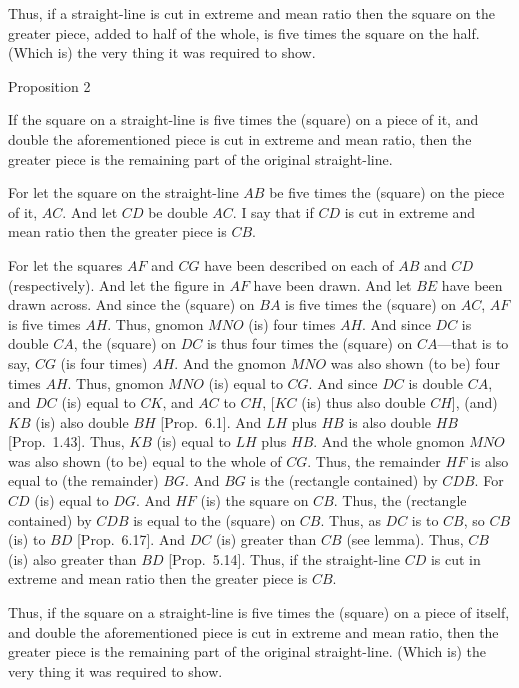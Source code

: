 Thus, if a straight-line is cut in extreme and mean ratio then the square on the
greater piece, added to half of the whole, is five times the square
on the half. (Which is) the very thing it was required to show.


\begin{center}
{\large Proposition 2}
\end{center}

If the square on a straight-line is five times the (square) on a piece of
it, and  double the aforementioned piece is cut in extreme and
mean ratio, then the greater piece  is  the remaining part of the
original straight-line. 

\epsfysize=2.5in
\centerline{}

For let the square on the straight-line $AB$ be five times the (square)
on the piece of it, $AC$. And let $CD$ be double $AC$. I say that
if $CD$ is cut in extreme and mean ratio then the greater piece
is $CB$. 

For let the squares $AF$ and $CG$ have been described on each of
$AB$ and $CD$ (respectively). And let the figure  in $AF$ have been drawn.
And let $BE$ have been drawn across. And since the (square) on $BA$
is five times the (square) on $AC$, $AF$ is five times $AH$. 
Thus, gnomon $MNO$ (is) four times $AH$. 
And since
$DC$ is double $CA$, the (square) on $DC$ is thus four times the (square)
on $CA$---that is to say, $CG$ (is four times) $AH$. And the gnomon
$MNO$ was also shown (to be) four times $AH$. Thus, gnomon $MNO$
(is) equal to $CG$. And since $DC$ is double $CA$, and $DC$
(is) equal to $CK$, and $AC$ to $CH$, [$KC$ (is) thus also double $CH$], (and) $KB$ (is) also double $BH$
[Prop.~6.1]. And $LH$ plus $HB$ is also double $HB$ [Prop.~1.43].
Thus, $KB$ (is) equal to $LH$ plus $HB$. And the whole gnomon
$MNO$ was also shown (to be) equal to the whole of $CG$. Thus, the
remainder $HF$ is also equal to (the remainder) $BG$.  And $BG$
is the (rectangle contained) by $CDB$. For  $CD$ (is) equal to $DG$.
And $HF$ (is) the square on $CB$. Thus, the (rectangle contained)
by $CDB$ is equal to the (square) on $CB$. Thus, as $DC$ is to $CB$,
so $CB$ (is) to $BD$ [Prop.~6.17]. And $DC$ (is) greater than $CB$ (see lemma). Thus, $CB$ (is) also greater than $BD$ [Prop.~5.14]. Thus, if the
straight-line $CD$ is cut in extreme and mean ratio then the greater piece is $CB$.

Thus, if the square on a straight-line is five times the (square) on a piece of
itself, and  double the aforementioned piece is cut in extreme and
mean ratio, then the greater piece is the remaining part of the
original straight-line.  (Which is) the very thing it was required to show.


